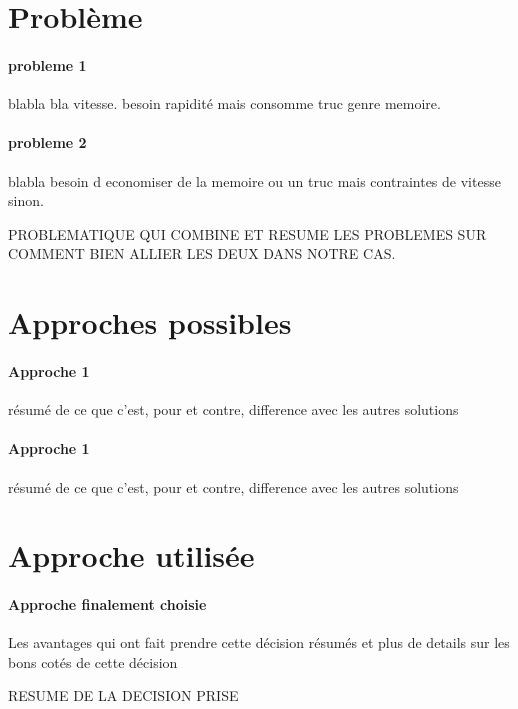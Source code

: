 \documentclass[
	headsepline=on,
	footsepline=on,
	twoside=off,
	abstract=on,
	DIV=10
]{scrreprt}
\begin{document}
			
			\section{Problème}
			
				\paragraph{probleme 1}
				blabla bla vitesse. besoin rapidité mais consomme truc genre memoire.
				
				\paragraph{probleme 2}
				blabla besoin d economiser de la memoire ou un truc mais contraintes de vitesse sinon.
			
				\begin{problem}
					PROBLEMATIQUE QUI COMBINE ET RESUME LES PROBLEMES SUR COMMENT BIEN ALLIER LES DEUX DANS NOTRE CAS.
				\end{problem}
			
			\section{Approches possibles}
			
				\paragraph{Approche 1}
				résumé de ce que c'est, pour et contre, difference avec les autres solutions
				
				
				\paragraph{Approche 1}
				résumé de ce que c'est, pour et contre, difference avec les autres solutions
			
			\section{Approche utilisée}
			
				\paragraph{Approche finalement choisie}
				Les avantages qui ont fait prendre cette décision résumés et plus de details sur les bons cotés de cette décision
			
				\begin{result}
					RESUME DE LA DECISION PRISE
				\end{result}
				
\end{document}
